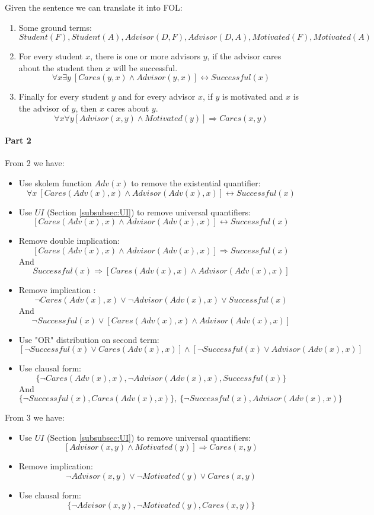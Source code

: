 \documentclass[10pt,a4paper]{article}
\begin{document}
\begin{itemize}
Given the sentence we can translate it into FOL:
\begin{enumerate}
\item Some ground terms:
\[Student(F),Student(A),Advisor(D,F),Advisor(D,A), Motivated(F),Motivated(A)\]
\item For every student $x$, there is one or more advisors $y$, if the advisor cares about the student then $x$ will be successful.
\[\forall x\exists y\ [Cares(y,x)\wedge Advisor(y,x)]\leftrightarrow Successful(x)\]
\item Finally for every student $y$ and for every advisor $x$, if $y$ is motivated and $x$ is the advisor of $y$, then $x$ cares about $y$.
\[\forall x \forall y [Advisor(x,y)\wedge Motivated(y)]\Rightarrow Cares(x,y)\]
\end{enumerate}

\paragraph{Part 2}

From 2 we have:
\begin{itemize}
\item Use skolem function $Adv(x)$ to remove the existential quantifier:
\[\forall x\ [Cares(Adv(x),x)\wedge Advisor(Adv(x),x)]\leftrightarrow Successful(x)\]

\item Use $UI$ (Section \ref{subsubsec:UI}) to remove universal quantifiers:
\[ [Cares(Adv(x),x)\wedge Advisor(Adv(x),x)]\leftrightarrow Successful(x)\]
\item Remove double implication:
\[ [Cares(Adv(x),x)\wedge Advisor(Adv(x),x)]\Rightarrow Successful(x)\]
And 
\[ Successful(x)\Rightarrow [Cares(Adv(x),x)\wedge Advisor(Adv(x),x)] \]
\item Remove implication :
\[ \neg Cares(Adv(x),x)\vee \neg Advisor(Adv(x),x)\vee Successful(x)\]
And
\[ \neg Successful(x)\vee [Cares(Adv(x),x)\wedge Advisor(Adv(x),x)] \]
\item Use "OR" distribution on second term:
\[ [\neg Successful(x)\vee Cares(Adv(x),x)]\wedge [\neg Successful(x)\vee Advisor(Adv(x),x)] \]
\item Use clausal form:
\[\lbrace  \neg Cares(Adv(x),x), \neg Advisor(Adv(x),x), Successful(x)\rbrace\]
And
\[\lbrace \neg Successful(x), Cares(Adv(x),x) \rbrace,\ \lbrace \neg Successful(x), Advisor(Adv(x),x) \rbrace \]
\end{itemize}


From 3 we have:
\begin{itemize}
\item Use $UI$ (Section \ref{subsubsec:UI}) to remove universal quantifiers:
\[ [Advisor(x,y)\wedge Motivated(y)]\Rightarrow Cares(x,y)\]
\item Remove implication:
\[ \neg Advisor(x,y)\vee \neg Motivated(y)\vee Cares(x,y)\]
\item Use clausal form:
\[ \lbrace \neg Advisor(x,y), \neg Motivated(y), Cares(x,y)\rbrace\]
\end{itemize}


\end{itemize}
\end{document}
